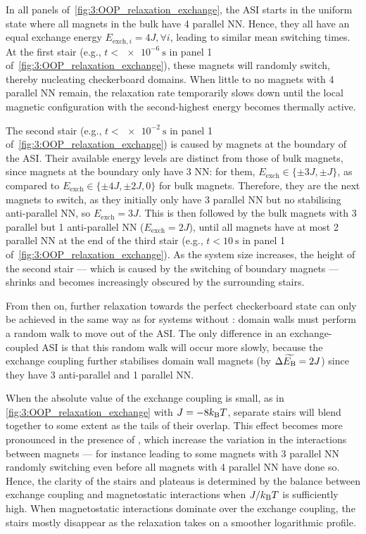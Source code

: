 In all panels of~\cref{fig:3:OOP_relaxation_exchange}, the ASI starts in the uniform state where all magnets in the bulk have 4 parallel NN.
Hence, they all have an equal exchange energy $E_{\mathrm{exch},i} = 4J, \forall i$, leading to similar mean switching times.
At the first stair (e.g., $t < \SI{e-6}{\second}$ in panel 1 of~\cref{fig:3:OOP_relaxation_exchange}), these magnets will randomly switch, thereby nucleating checkerboard domains.
When little to no magnets with 4 parallel NN remain, the relaxation rate temporarily slows down until the local magnetic configuration with the second-highest energy becomes thermally active. \par
The second stair (e.g., $t < \SI{e-2}{\second}$ in panel 1 of~\cref{fig:3:OOP_relaxation_exchange}) is caused by magnets at the boundary of the ASI.
Their available energy levels are distinct from those of bulk magnets, since magnets at the boundary only have 3 NN: for them, $E_\mathrm{exch} \in \{\pm 3J, \pm J\}$, as compared to $E_\mathrm{exch} \in \{\pm 4J, \pm 2J, 0\}$ for bulk magnets.
Therefore, they are the next magnets to switch, as they initially only have 3 parallel NN but no stabilising anti-parallel NN, so $E_\mathrm{exch} = 3J$.
This is then followed by the bulk magnets with 3 parallel but 1 anti-parallel NN ($E_\mathrm{exch} = 2J$), until all magnets have at most 2 parallel NN at the end of the third stair (e.g., $t < \SI{10}{\second}$ in panel 1 of~\cref{fig:3:OOP_relaxation_exchange}).
As the system size increases, the height of the second stair --- which is caused by the switching of boundary magnets --- shrinks and becomes increasingly obscured by the surrounding stairs. \par
From then on, further relaxation towards the perfect checkerboard state can only be achieved in the same way as for systems without : domain walls must perform a random walk to move out of the ASI.
The only difference in an exchange-coupled ASI is that this random walk will occur more slowly, because the exchange coupling further stabilises domain wall magnets (by $\Delta \widetilde{E_\mathrm{B}} = 2J$) since they have 3 anti-parallel and 1 parallel NN. \par
When the absolute value of the exchange coupling is small, as in \cref{fig:3:OOP_relaxation_exchange} with $J=-8\kBT$, separate stairs will blend together to some extent as the tails of their  overlap.
This effect becomes more pronounced in the presence of , which increase the variation in the interactions between magnets --- for instance leading to some magnets with 3 parallel NN randomly switching even before all magnets with 4 parallel NN have done so.
Hence, the clarity of the stairs and plateaus is determined by the balance between exchange coupling and magnetostatic interactions when $J/\kBT$ is sufficiently high.
When magnetostatic interactions dominate over the exchange coupling, the stairs mostly disappear as the relaxation takes on a smoother logarithmic profile.

